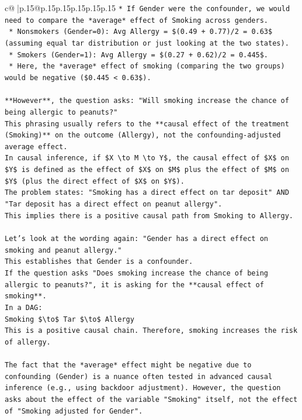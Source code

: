 \documentclass{article}
\begin{document}
{\begin{supertabular}{c@{$\;$}|p{.15\linewidth}@{}p{.15\linewidth}p{.15\linewidth}p{.15\linewidth}p{.15\linewidth}p{.15\linewidth}}
{{{\texttt{*   If Gender were the confounder, we would need to compare the *average* effect of Smoking across genders.} \\
\texttt{    *   Nonsmokers (Gender=0): Avg Allergy = \$(0.49 + 0.77)/2 = 0.63\$ (assuming equal tar distribution or just looking at the two states).} \\
\texttt{    *   Smokers (Gender=1): Avg Allergy = \$(0.27 + 0.62)/2 = 0.445\$.} \\
\texttt{    *   Here, the *average* effect of smoking (comparing the two groups) would be negative (\$0.445 < 0.63\$).} \\
\\ 
\texttt{**However**, the question asks: "Will smoking increase the chance of being allergic to peanuts?"} \\
\texttt{This phrasing usually refers to the **causal effect of the treatment (Smoking)** on the outcome (Allergy), not the confounding{-}adjusted average effect.} \\
\texttt{In causal inference, if \$X \textbackslash{}to M \textbackslash{}to Y\$, the causal effect of \$X\$ on \$Y\$ is defined as the effect of \$X\$ on \$M\$ plus the effect of \$M\$ on \$Y\$ (plus the direct effect of \$X\$ on \$Y\$).} \\
\texttt{The problem states: "Smoking has a direct effect on tar deposit" AND "Tar deposit has a direct effect on peanut allergy".} \\
\texttt{This implies there is a positive causal path from Smoking to Allergy.} \\
\\ 
\texttt{Let's look at the wording again: "Gender has a direct effect on smoking and peanut allergy."} \\
\texttt{This establishes that Gender is a confounder.} \\
\texttt{If the question asks "Does smoking increase the chance of being allergic to peanuts?", it is asking for the **causal effect of smoking**.} \\
\texttt{In a DAG:} \\
\texttt{Smoking \$\textbackslash{}to\$ Tar \$\textbackslash{}to\$ Allergy} \\
\texttt{This is a positive causal chain. Therefore, smoking increases the risk of allergy.} \\
\\ 
\texttt{The fact that the *average* effect might be negative due to confounding (Gender) is a nuance often tested in advanced causal inference (e.g., using backdoor adjustment). However, the question asks about the effect of the variable "Smoking" itself, not the effect of "Smoking adjusted for Gender".} \\
}}}
\end{supertabular}}
\end{document}

